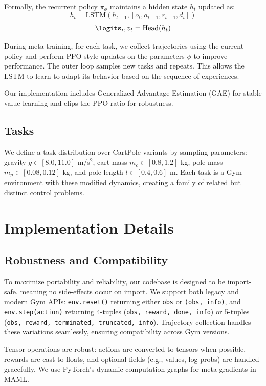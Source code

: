 \documentclass[11pt,a4paper]{article}
\begin{document}
Formally, the recurrent policy $\pi_\phi$ maintains a hidden state $h_t$ updated as:
\[
h_t = \text{LSTM}(h_{t-1}, [o_t, a_{t-1}, r_{t-1}, d_t])
\]
\[
\logits_t, v_t = \text{Head}(h_t)
\]

During meta-training, for each task, we collect trajectories using the current policy and perform PPO-style updates on the parameters $\phi$ to improve performance. The outer loop samples new tasks and repeats. This allows the LSTM to learn to adapt its behavior based on the sequence of experiences.

Our implementation includes Generalized Advantage Estimation (GAE) for stable value learning and clips the PPO ratio for robustness.

\subsection{Tasks}
We define a task distribution over CartPole variants by sampling parameters: gravity $g \in [8.0, 11.0]$ m/s$^2$, cart mass $m_c \in [0.8, 1.2]$ kg, pole mass $m_p \in [0.08, 0.12]$ kg, and pole length $l \in [0.4, 0.6]$ m. Each task is a Gym environment with these modified dynamics, creating a family of related but distinct control problems.

\section{Implementation Details}
\subsection{Robustness and Compatibility}
To maximize portability and reliability, our codebase is designed to be import-safe, meaning no side-effects occur on import. We support both legacy and modern Gym APIs: \texttt{env.reset()} returning either \texttt{obs} or \texttt{(obs, info)}, and \texttt{env.step(action)} returning 4-tuples (\texttt{obs, reward, done, info}) or 5-tuples (\texttt{obs, reward, terminated, truncated, info}). Trajectory collection handles these variations seamlessly, ensuring compatibility across Gym versions.

Tensor operations are robust: actions are converted to tensors when possible, rewards are cast to floats, and optional fields (e.g., values, log-probs) are handled gracefully. We use PyTorch's dynamic computation graphs for meta-gradients in MAML.
\end{document}
